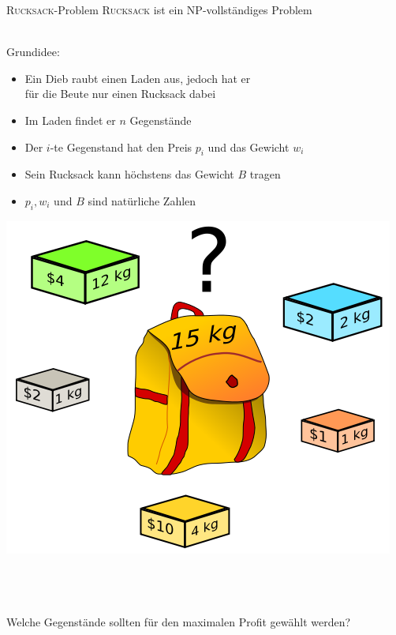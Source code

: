 \begin{frame}{\textsc{Rucksack}-Problem}
    \textsc{Rucksack} ist ein NP-vollständiges Problem \\~\\
    \pause
    
    \begin{minipage}{0.70\textwidth}
    Grundidee: 
    
    \begin{itemize}
        \item Ein Dieb raubt einen Laden aus, jedoch hat er\\für die Beute nur einen Rucksack dabei
        \item Im Laden findet er $n$ Gegenstände
        \item Der $i$-te Gegenstand hat den Preis $p_i$ und das Gewicht $w_i$
        \item Sein Rucksack kann höchstens das Gewicht $B$ tragen
        \item $p_i, w_i$ und $B$ sind natürliche Zahlen
    \end{itemize}
\end{minipage}
	\begin{minipage}[left]{0.25\textwidth}
			\includegraphics[width=\textwidth]{img/Knapsack.png}
	\end{minipage}
	\\~\\~\\
	 \alert{Welche Gegenstände sollten für den maximalen Profit gewählt werden?} 
\end{frame}
